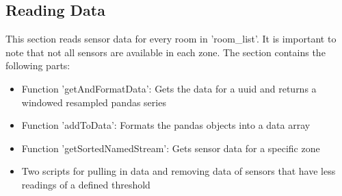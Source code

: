\documentclass[11pt]{article}
\providecommand{\tightlist}{%
      \setlength{\itemsep}{0pt}\setlength{\parskip}{0pt}}
\begin{document}
    \subsection{Reading Data}\label{reading-data}

This section reads sensor data for every room in 'room\_list'. It is
important to note that not all sensors are available in each zone. The
section contains the following parts:

\begin{itemize}
\tightlist
\item
  Function 'getAndFormatData': Gets the data for a uuid and returns a
  windowed resampled pandas series
\item
  Function 'addToData': Formats the pandas objects into a data array
\item
  Function 'getSortedNamedStream': Gets sensor data for a specific zone
\item
  Two scripts for pulling in data and removing data of sensors that have
  less readings of a defined threshold
\end{itemize}
\end{document}
